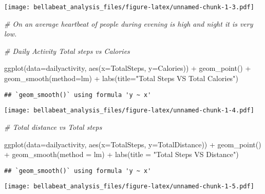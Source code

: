 \documentclass[
]{article}
\newenvironment{Shaded}{\begin{snugshade}}{\end{snugshade}}
\newcommand{\AttributeTok}[1]{\textcolor[rgb]{0.77,0.63,0.00}{#1}}
\newcommand{\CommentTok}[1]{\textcolor[rgb]{0.56,0.35,0.01}{\textit{#1}}}
\newcommand{\FunctionTok}[1]{\textcolor[rgb]{0.00,0.00,0.00}{#1}}
\newcommand{\NormalTok}[1]{#1}
\newcommand{\SpecialCharTok}[1]{\textcolor[rgb]{0.00,0.00,0.00}{#1}}
\newcommand{\StringTok}[1]{\textcolor[rgb]{0.31,0.60,0.02}{#1}}
\begin{document}
\texttt{[image: bellabeat\_analysis\_files/figure-latex/unnamed-chunk-1-3.pdf]}

\begin{Shaded}
\begin{Highlighting}[]
\CommentTok{\# On an average heartbeat of people during evening is high and night it is very low.}

\CommentTok{\# Daily Activity Total steps vs Calories}

\FunctionTok{ggplot}\NormalTok{(}\AttributeTok{data=}\NormalTok{dailyactivity, }\FunctionTok{aes}\NormalTok{(}\AttributeTok{x=}\NormalTok{TotalSteps, }\AttributeTok{y=}\NormalTok{Calories)) }\SpecialCharTok{+} 
  \FunctionTok{geom\_point}\NormalTok{() }\SpecialCharTok{+} 
  \FunctionTok{geom\_smooth}\NormalTok{(}\AttributeTok{method=}\NormalTok{lm) }\SpecialCharTok{+}
  \FunctionTok{labs}\NormalTok{(}\AttributeTok{title=}\StringTok{"Total Steps VS Total Calories"}\NormalTok{)}
\end{Highlighting}
\end{Shaded}

\begin{verbatim}
## `geom_smooth()` using formula 'y ~ x'
\end{verbatim}

\texttt{[image: bellabeat\_analysis\_files/figure-latex/unnamed-chunk-1-4.pdf]}

\begin{Shaded}
\begin{Highlighting}[]
\CommentTok{\# Total distance vs Total steps}

\FunctionTok{ggplot}\NormalTok{(}\AttributeTok{data=}\NormalTok{dailyactivity, }\FunctionTok{aes}\NormalTok{(}\AttributeTok{x=}\NormalTok{TotalSteps, }\AttributeTok{y=}\NormalTok{TotalDistance)) }\SpecialCharTok{+}
  \FunctionTok{geom\_point}\NormalTok{() }\SpecialCharTok{+} 
  \FunctionTok{geom\_smooth}\NormalTok{(}\AttributeTok{method =}\NormalTok{ lm) }\SpecialCharTok{+}
  \FunctionTok{labs}\NormalTok{(}\AttributeTok{title =} \StringTok{"Total Steps VS Distance"}\NormalTok{)}
\end{Highlighting}
\end{Shaded}

\begin{verbatim}
## `geom_smooth()` using formula 'y ~ x'
\end{verbatim}

\texttt{[image: bellabeat\_analysis\_files/figure-latex/unnamed-chunk-1-5.pdf]}
\end{document}
